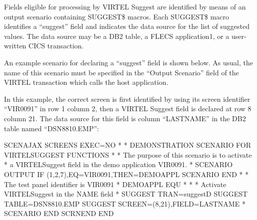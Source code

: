 \documentclass[letterpaper,10pt,english]{sphinxmanual}
\begin{document}
Fields eligible for processing by VIRTEL Suggest are identified by means of an output scenario containing SUGGEST\$
macros. Each SUGGEST\$ macro identifies a “suggest” field and indicates the data source for the list of suggested
values. The data source may be a DB2 table, a FLECS application1, or a user-written CICS transaction.

An example scenario for declaring a “suggest” field is shown below. As usual, the name of this scenario must be
specified in the “Output Scenario” field of the VIRTEL transaction which calls the host application.

In this example, the correct screen is first identified by using its screen identifier “VIR0091” in row 1 column 2, then a
VIRTEL Suggest field is declared at row 8 column 21. The data source for this field is column “LASTNAME” in the DB2
table named “DSN8810.EMP”:

\begin{sphinxVerbatim}[commandchars=\\\{\}]
SCENAJAX SCREENS EXEC=NO
*
* DEMONSTRATION SCENARIO FOR VIRTEL\PYGZhy{}SUGGEST FUNCTIONS
*
* The purpose of this scenario is to activate
* a VIRTEL\PYGZhy{}Suggest field in the demo application VIR0091.
*
        SCENARIO OUTPUT
        IF\PYGZdl{} (1,2,7),EQ=\PYGZsq{}VIR0091\PYGZsq{},THEN=DEMOAPPL
        SCENARIO END
*
* The test panel identifier is VIR0091
*
DEMOAPPL EQU *
*
* Activate VIRTEL\PYGZhy{}Suggest in the NAME field
*
        SUGGEST\PYGZdl{} TRAN=\PYGZsq{}suggestD\PYGZsq{}
        SUGGEST\PYGZdl{} TABLE=\PYGZsq{}DSN8810.EMP\PYGZsq{}
        SUGGEST\PYGZdl{} SCREEN=(8,21),FIELD=\PYGZsq{}LASTNAME\PYGZsq{}
*
SCENARIO END
SCRNEND
END
\end{sphinxVerbatim}


\end{document}
